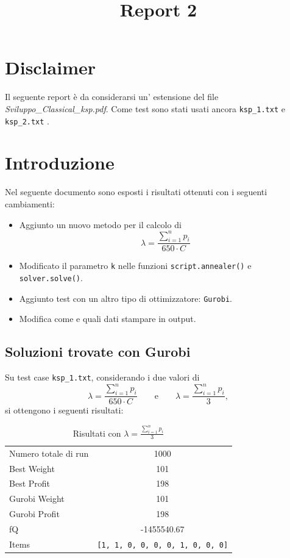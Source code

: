 \documentclass[a4paper,12pt]{article}
\title{Report 2}
\begin{document}
\maketitle

\newpage

\section{Disclaimer}
Il seguente report è da considerarsi un' estensione del file \emph{Sviluppo\_Classical\_ksp.pdf}. 
Come test sono stati usati ancora \texttt{ksp\_1.txt} e \texttt{ksp\_2.txt} . 

\section{Introduzione}\label{sec:Introduzione}
Nel seguente documento sono esposti i risultati ottenuti con i seguenti cambiamenti:

\begin{itemize}
    \item Aggiunto un nuovo metodo per il calcolo di
    \[
    \lambda = \frac{\sum_{i=1}^{n} p_i}{650 \cdot C}
    \]

    \item Modificato il parametro \texttt{k} nelle funzioni \texttt{script.annealer()} e \texttt{solver.solve()}.
    
    \item Aggiunto test con un altro tipo di ottimizzatore: \texttt{Gurobi}.
    
    \item Modifica come e quali dati stampare in output.
\end{itemize}

\subsection{Soluzioni trovate con Gurobi}
Su test case \texttt{ksp\_1.txt}, considerando i due valori di
\[
\lambda = \frac{\sum_{i=1}^{n} p_i}{650 \cdot C}
\qquad \text{e} \qquad
\lambda = \frac{\sum_{i=1}^{n} p_i}{3},
\]
si ottengono i seguenti risultati:

\begin{table}[H]
\centering
\begin{tabular}{lc}
\toprule
Numero totale di run & 1000 \\
Best Weight & 101 \\
Best Profit & 198 \\
Gurobi Weight & 101 \\
Gurobi Profit & 198 \\
fQ & -1455540.67 \\
Items & \texttt{[1, 1, 0, 0, 0, 0, 1, 0, 0, 0]} \\
\bottomrule
\end{tabular}
\caption{Risultati con $\lambda = \displaystyle \frac{\sum_{i=1}^{n} p_i}{3}$}
\label{tab:tab1}
\end{table}
\end{document}
